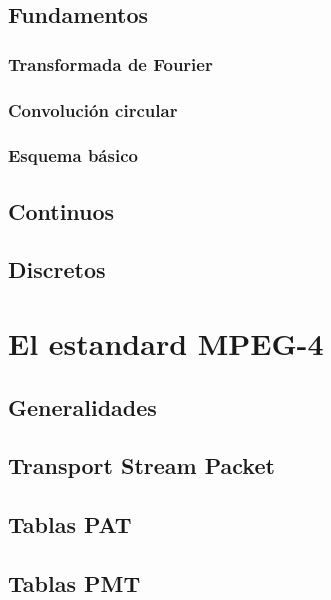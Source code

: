 	\subsection{Fundamentos}
		\subsubsection{Transformada de Fourier}
		\subsubsection{Convoluci\'on circular}
		\subsubsection{Esquema b\'asico}
	
	\subsection{Continuos}

	\subsection{Discretos}

\section{El estandard MPEG-4}
	\subsection{Generalidades}
	\subsection{Transport Stream Packet}
	\subsection{Tablas PAT}
	\subsection{Tablas PMT}

